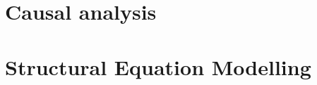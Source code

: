 \section{Causal analysis}
\label{sec:methods:causal}

\section{Structural Equation Modelling}
\label{sec:methods:sem}
